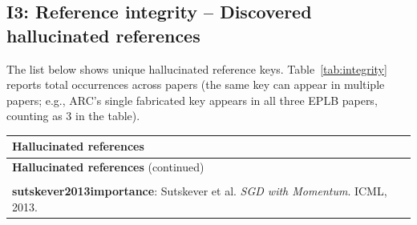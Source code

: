 \subsection{I3: Reference integrity -- Discovered hallucinated references}\label{appx:discovered_hallucinated_references}

The list below shows unique hallucinated reference keys.
Table~\ref{tab:integrity} reports total occurrences across papers (the same key can appear in multiple papers; e.g., ARC's single fabricated key appears in all three EPLB papers, counting as 3 in the table).

\begin{longtable}{@{}p{15cm}@{}}
\toprule
\textbf{Hallucinated references} \\
\midrule
\endfirsthead
\toprule
\textbf{Hallucinated references} (continued) \\
\midrule
\endhead
\midrule
\endfoot
\bottomrule
\endlastfoot

\midrule
\multicolumn{1}{c}{\textbf{ARC (1)}} \\
\midrule
\textbf{sutskever2013importance}: Sutskever et al. \textit{SGD with Momentum}. ICML, 2013. \\


\end{longtable}
